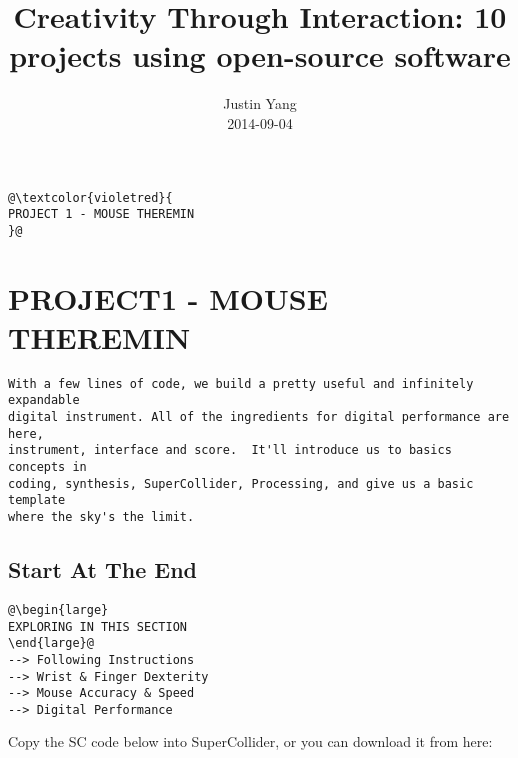 \documentclass[twoside,a4paper]{refart}
\title{Creativity Through Interaction: 10 projects using open-source software}
\author{Justin Yang \\
2014-09-04   \\
}
\date{}
\begin{document}
\maketitle
\tableofcontents
\newpage
\begin{changemargin}{-3.5cm}{0cm} 
\begin{lstlisting}[style=sectit]
@\textcolor{violetred}{
PROJECT 1 - MOUSE THEREMIN
}@
\end{lstlisting}
\end{changemargin}
\section{PROJECT1 - MOUSE THEREMIN}
\begin{changemargin}{-1.5cm}{0.0cm} 
\begin{lstlisting}[style=sumstyle1]
With a few lines of code, we build a pretty useful and infinitely expandable
digital instrument. All of the ingredients for digital performance are here,
instrument, interface and score.  It'll introduce us to basics concepts in
coding, synthesis, SuperCollider, Processing, and give us a basic template
where the sky's the limit.
\end{lstlisting} 
\end{changemargin}
\subsection{Start At The End}
\begin{changemargin}{1.8cm}{0.0cm} 
\begin{lstlisting}[style=sumstyle2]
@\begin{large}
EXPLORING IN THIS SECTION
\end{large}@
--> Following Instructions
--> Wrist & Finger Dexterity
--> Mouse Accuracy & Speed
--> Digital Performance
\end{lstlisting} 
\end{changemargin}
Copy the SC code below into SuperCollider, or you can download it from here:
\end{document}
